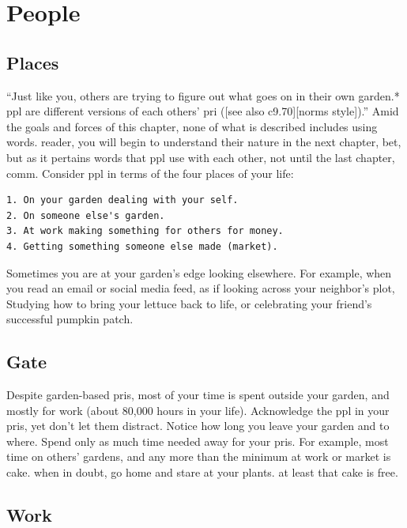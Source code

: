 \documentclass[
]{book}
\begin{document}
\hypertarget{ppl}{%
\chapter{People}\label{ppl}}

\hypertarget{places}{%
\section{Places}\label{places}}

``Just like you, others are trying to figure out what goes on in their own garden.* ppl are different versions of each others' pri ({[}see also c9.70{]}{[}norms style{]}).''
Amid the goals and forces of this chapter, none of what is described includes using words. reader, you will begin to understand their nature in the next chapter, bet, but as it pertains words that ppl use with each other, not until the last chapter, comm.
Consider ppl in terms of the four places of your life:

\begin{verbatim}
1. On your garden dealing with your self.
2. On someone else's garden.
3. At work making something for others for money.
4. Getting something someone else made (market).
\end{verbatim}

Sometimes you are at your garden's edge looking elsewhere.
For example, when you read an email or social media feed, as if looking across your neighbor's plot,
Studying how to bring your lettuce back to life, or celebrating your friend's successful pumpkin patch.

\hypertarget{gate}{%
\section{Gate}\label{gate}}

Despite garden-based pris, most of your time is spent outside your garden, and mostly for work (about 80,000 hours in your life).
Acknowledge the ppl in your pris, yet don't let them distract.
Notice how long you leave your garden and to where.
Spend only as much time needed away for your pris.
For example, most time on others' gardens, and any more than the minimum at work or market is cake. when in doubt, go home and stare at your plants. at least that cake is free.

\hypertarget{work}{%
\section{Work}\label{work}}
\end{document}
